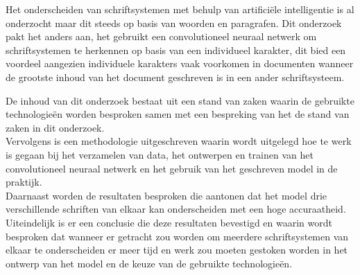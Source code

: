 Het onderscheiden van schriftsystemen met behulp van artificiële intelligentie is al onderzocht maar dit steeds op basis van woorden en paragrafen.
Dit onderzoek pakt het anders aan, het gebruikt een convolutioneel neuraal netwerk om schriftsystemen te herkennen op basis van een individueel karakter, dit bied een voordeel aangezien individuele karakters vaak voorkomen in documenten wanneer de grootste inhoud van het document geschreven is in een ander schriftsysteem.

De inhoud van dit onderzoek bestaat uit een stand van zaken waarin de gebruikte technologieën worden besproken samen met een bespreking van het de stand van zaken in dit onderzoek. \\
Vervolgens is een methodologie uitgeschreven waarin wordt uitgelegd hoe te werk is gegaan bij het verzamelen van data, het ontwerpen en trainen van het convolutioneel neuraal netwerk en het gebruik van het geschreven model in de praktijk. \\
Daarnaast worden de resultaten besproken die aantonen dat het model drie verschillende schriften van elkaar kan onderscheiden met een hoge accuraatheid. \\
Uiteindelijk is er een conclusie die deze resultaten bevestigd en waarin wordt besproken dat wanneer er getracht zou worden om meerdere schriftsystemen van elkaar te onderscheiden er meer tijd en werk zou moeten gestoken worden in het ontwerp van het model en de keuze van de gebruikte technologieën.